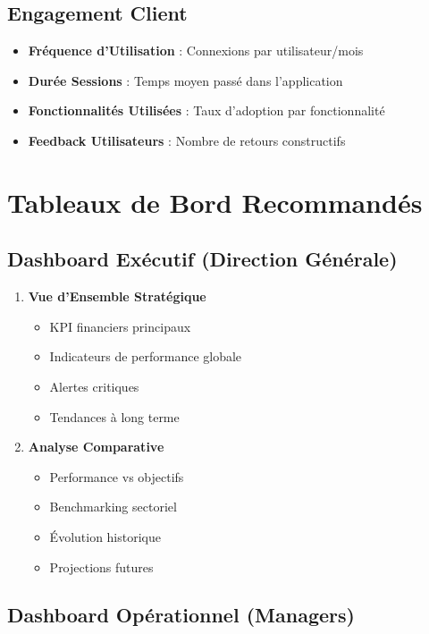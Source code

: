 \documentclass[12pt,a4paper]{article}
\begin{document}
\subsection{Engagement Client}

\begin{itemize}
    \item \textbf{Fréquence d'Utilisation} : Connexions par utilisateur/mois
    \item \textbf{Durée Sessions} : Temps moyen passé dans l'application
    \item \textbf{Fonctionnalités Utilisées} : Taux d'adoption par fonctionnalité
    \item \textbf{Feedback Utilisateurs} : Nombre de retours constructifs
\end{itemize}

\section{Tableaux de Bord Recommandés}

\subsection{Dashboard Exécutif (Direction Générale)}

\begin{enumerate}
    \item \textbf{Vue d'Ensemble Stratégique}
    \begin{itemize}
        \item KPI financiers principaux
        \item Indicateurs de performance globale
        \item Alertes critiques
        \item Tendances à long terme
    \end{itemize}
    
    \item \textbf{Analyse Comparative}
    \begin{itemize}
        \item Performance vs objectifs
        \item Benchmarking sectoriel
        \item Évolution historique
        \item Projections futures
    \end{itemize}
\end{enumerate}

\subsection{Dashboard Opérationnel (Managers)}
\end{document}
